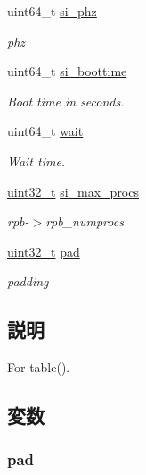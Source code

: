 \begin{DoxyCompactItemize}
uint64\_\-t \hyperlink{structTru64_1_1tbl__sysinfo_a0d64d5cfd0905608018f7a103fb6db89}{si\_\-phz}
\begin{DoxyCompactList}\small\item\em phz \item\end{DoxyCompactList}\item 
uint64\_\-t \hyperlink{structTru64_1_1tbl__sysinfo_a88cbcb3dfc04059ff4adefb1ccbebec4}{si\_\-boottime}
\begin{DoxyCompactList}\small\item\em Boot time in seconds. \item\end{DoxyCompactList}\item 
uint64\_\-t \hyperlink{structTru64_1_1tbl__sysinfo_a26c8b9811207ae95ab63ce8c4f8b88b6}{wait}
\begin{DoxyCompactList}\small\item\em Wait time. \item\end{DoxyCompactList}\item 
\hyperlink{Type_8hh_a435d1572bf3f880d55459d9805097f62}{uint32\_\-t} \hyperlink{structTru64_1_1tbl__sysinfo_a6c16d857f83a24c5f4d487f5a5d16047}{si\_\-max\_\-procs}
\begin{DoxyCompactList}\small\item\em rpb-\/$>$rpb\_\-numprocs \item\end{DoxyCompactList}\item 
\hyperlink{Type_8hh_a435d1572bf3f880d55459d9805097f62}{uint32\_\-t} \hyperlink{structTru64_1_1tbl__sysinfo_af2191e484304a1e686e883bd359037a3}{pad}
\begin{DoxyCompactList}\small\item\em padding \item\end{DoxyCompactList}\end{DoxyCompactItemize}


\subsection{説明}
For table(). 

\subsection{変数}
\hypertarget{structTru64_1_1tbl__sysinfo_af2191e484304a1e686e883bd359037a3}{
\subsubsection[{pad}]{ {\bf pad}}}
\label{structTru64_1_1tbl__sysinfo_af2191e484304a1e686e883bd359037a3}


